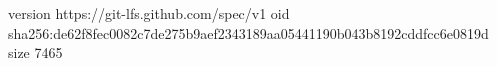 version https://git-lfs.github.com/spec/v1
oid sha256:de62f8fec0082c7de275b9aef2343189aa05441190b043b8192cddfcc6e0819d
size 7465
